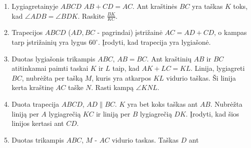 \begin{enumerate}
\item Lygiagretainyje $ABCD$ $AB + CD = AC$. Ant kraštinės $BC$ yra taškas
  $K$ toks, kad $\angle ADB = \angle BDK$.  Raskite $\frac{BK}{KC}$.
\item Trapecijos $ABCD$ ($AD, BC$ - pagrindai) įstrižainė $AC = AD + CD$, o
  kampas tarp įstrižainių yra lygus $60^\circ$. Įrodyti, kad trapecija yra
  lygiašonė.
\item Duotas lygiašonis trikampis $ABC$, $AB = BC$. Ant kraštinių $AB$ ir
  $BC$ atitinkamai paimti taskai $K$ ir $L$ taip, kad $AK + LC = KL$.
  Linija, lygiagreti $BC$, nubrėžta per tašką $M$, kuris yra atkarpos $KL$
  vidurio taškas. Ši linija kerta kraštinę $AC$ taške $N$. Rasti kampą
  $\angle KNL$.
\item Duota trapecija $ABCD$, $AD\parallel{BC}$. $K$ yra bet koks taškas
  ant $AB$. Nubrėžta liniją per $A$ lygiagrečią $KC$ ir liniją per $B$
  lygiagrečią $DK$. Įrodyti, kad šios linijos kertasi ant $CD$.
\item Duotas trikampis $ABC$, $M$ - $AC$ vidurio taskas.  Taškas $D$ ant

\end{enumerate}
